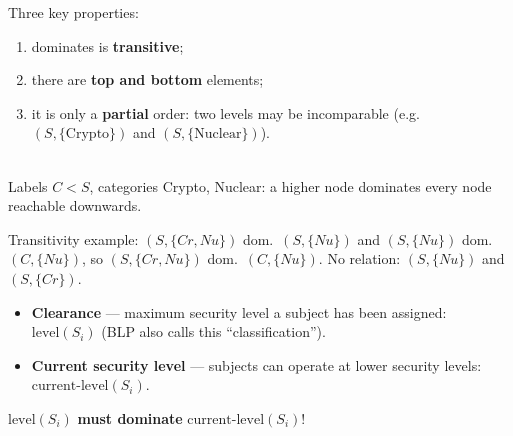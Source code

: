 \begin{propbox}[title=Dominance lattice]
Three key properties:
\begin{enumerate}[label=(\alph*)]
  \item dominates is \textbf{transitive};
  \item there are \textbf{top and bottom} elements;
  \item it is only a \textbf{partial} order: two levels may be incomparable (e.g.\
        $(S, \{\text{Crypto}\})$ and $(S, \{\text{Nuclear}\})$).
\end{enumerate}
\begin{center}
 \\
{\small Labels $C < S$, categories Crypto, Nuclear: a higher node dominates every node
reachable downwards.}
\end{center}
Transitivity example: $(S, \{Cr, Nu\})$ dom.\ $(S, \{Nu\})$ and $(S, \{Nu\})$ dom.\ $(C,
\{Nu\})$, so $(S, \{Cr, Nu\})$ dom.\ $(C, \{Nu\})$. No relation: $(S, \{Nu\})$ and $(S,
\{Cr\})$.
\end{propbox}

\begin{defnbox}[title=Clearance of subjects]
\begin{itemize}
  \item \textbf{Clearance} --- maximum security level a subject has been assigned:
        $\text{level}(S_i)$ (BLP also calls this ``classification'').
  \item \textbf{Current security level} --- subjects can operate at lower security
        levels: $\text{current-level}(S_i)$.
\end{itemize}
$\text{level}(S_i)$ \textbf{must dominate} $\text{current-level}(S_i)$!
\end{defnbox}

